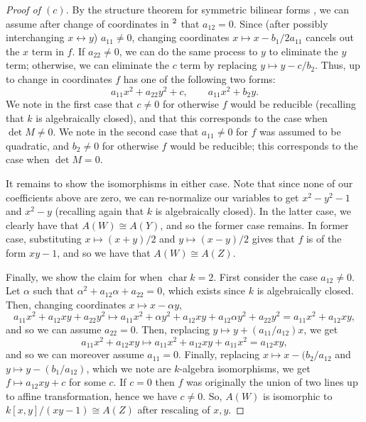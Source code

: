 \documentclass[12pt,letterpaper]{article}
\theoremstyle{definition}
\theoremstyle{remark}
\numberwithin{equation}{section}
\numberwithin{figure}{problem}
\let\AA\relax
\DeclareMathOperator{\AA}{\mathbb{A}}
\DeclareMathOperator{\Char}{char}
\begin{document}
\begin{proof}[Proof of $(c)$]
  By the structure theorem for symmetric bilinear forms \cite[Ch.~XV, Thm.~3.1]{Lan02}, we can assume after change of coordinates in $\AA^2$ that $a_{12} = 0$. Since (after possibly interchanging $x \leftrightarrow y$) $a_{11} \ne 0$, changing coordinates $x \mapsto x - b_1/2a_{11}$ cancels out the $x$ term in $f$. If $a_{22} \ne 0$, we can do the same process to $y$ to eliminate the $y$ term; otherwise, we can eliminate the $c$ term by replacing $y \mapsto y - c/b_2$. Thus, up to change in coordinates $f$ has one of the following two forms:
  \begin{equation*}
    a_{11}x^2 + a_{22}y^2 + c, \qquad a_{11}x^2 + b_2y.
  \end{equation*}
  We note in the first case that $c \ne 0$ for otherwise $f$ would be reducible (recalling that $k$ is algebraically closed), and that this corresponds to the case when $\det M \ne 0$. We note in the second case that $a_{11} \ne 0$ for $f$ was assumed to be quadratic, and $b_2 \ne 0$ for otherwise $f$ would be reducible; this corresponds to the case when $\det M = 0$.
  \par It remains to show the isomorphisms in either case. Note that since none of our coefficients above are zero, we can re-normalize our variables to get $x^2 - y^2 - 1$ and $x^2 - y$ (recalling again that $k$ is algebraically closed). In the latter case, we clearly have that $A(W) \cong A(Y)$, and so the former case remains. In former case, substituting $x \mapsto (x+y)/2$ and $y \mapsto (x-y)/2$ gives that $f$ is of the form $xy - 1$, and so we have that $A(W) \cong A(Z)$.
  \par Finally, we show the claim for when $\Char k = 2$. First consider the case $a_{12} \ne 0$. Let $\alpha$ such that $\alpha^2 + a_{12}\alpha + a_{22} = 0$, which exists since $k$ is algebraically closed. Then, changing coordinates $x \mapsto x - \alpha y$,
  \begin{equation*}
    a_{11}x^2 + a_{12}xy + a_{22}y^2 \mapsto a_{11}x^2 + \alpha y^2 + a_{12}xy + a_{12}\alpha y^2 + a_{22}y^2 = a_{11}x^2 + a_{12}xy,
  \end{equation*}
  and so we can assume $a_{22} = 0$. Then, replacing $y \mapsto y + (a_{11}/a_{12})x$, we get
  \begin{equation*}
    a_{11}x^2 + a_{12}xy \mapsto a_{11}x^2 + a_{12}xy + a_{11}x^2 = a_{12}xy,
  \end{equation*}
  and so we can moreover assume $a_{11} = 0$. Finally, replacing $x \mapsto x - (b_2/a_{12}$ and $y \mapsto y - (b_1/a_{12})$, which we note are $k$-algebra isomorphisms, we get $f \mapsto a_{12}xy + c$ for some $c$. If $c = 0$ then $f$ was originally the union of two lines up to affine transformation, hence we have $c \ne 0$. So, $A(W)$ is isomorphic to $k[x,y]/(xy - 1) \cong A(Z)$ after rescaling of $x,y$.

\end{proof}
\end{document}
